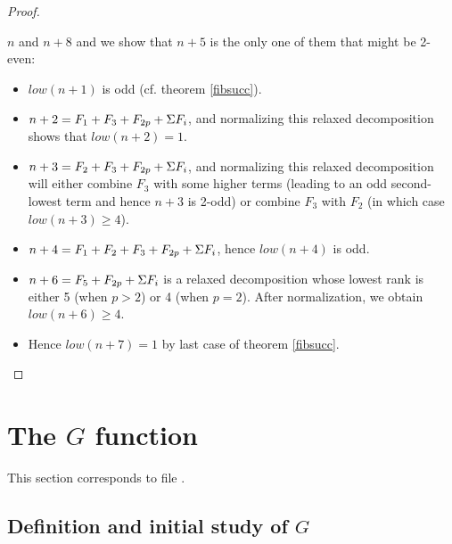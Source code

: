 \documentclass[a4paper,11pt]{article}
\begin{document}
\begin{proof}
\begin{enumerate}
  $n$ and $n+8$ and we show that $n+5$ is the only one of them that
  might be 2-even:
  \begin{itemize}
  \item $low(n+1)$ is odd (cf. theorem \ref{fibsucc}).
  \item $n+2 = F_1+F_3+F_{2p}+\Sigma F_i$, and normalizing this
    relaxed decomposition shows that $low(n+2)=1$.
  \item $n+3 = F_2+F_3+F_{2p}+\Sigma F_i$, and normalizing this
    relaxed decomposition will either combine $F_3$ with some
    higher terms (leading to an odd second-lowest term and
    hence $n+3$ is 2-odd) or combine $F_3$ with $F_2$ (in which
    case $low(n+3)\ge 4$).
  \item $n+4 = F_1+F_2+F_3+F_{2p}+\Sigma F_i$, hence $low(n+4)$ is
    odd.
  \item $n+6 = F_5+F_{2p}+\Sigma F_i$ is a relaxed decomposition
   whose lowest rank is either 5 (when $p>2$) or 4 (when $p=2$).
   After normalization, we obtain $low(n+6)\ge 4$.
  \item Hence $low(n+7)=1$ by last case of theorem \ref{fibsucc}.
  \end{itemize}
\end{enumerate}
\end{proof}

\section{The $G$ function}

This section corresponds to file .

\subsection{Definition and initial study of $G$}
\end{document}

